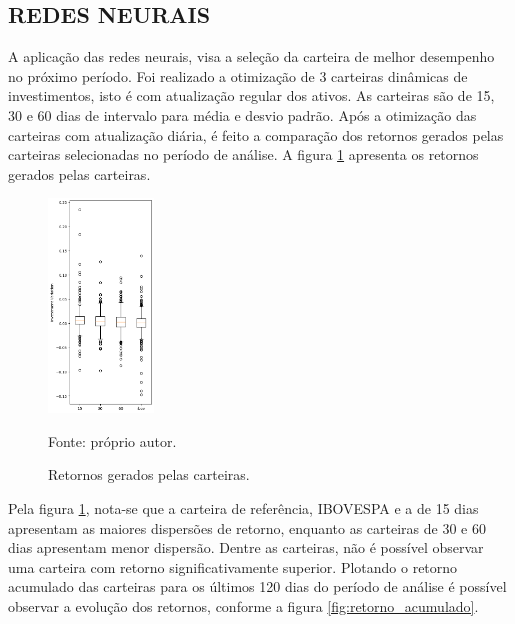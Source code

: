     \subsection{REDES NEURAIS}
    
        \ipar A aplicação das redes neurais, visa a seleção da carteira de melhor desempenho no próximo período. Foi realizado a otimização de 3 carteiras dinâmicas de investimentos, isto é com atualização regular dos ativos. As carteiras são de 15, 30 e 60 dias de intervalo para média e desvio padrão. Após a otimização das carteiras com atualização diária, é feito a comparação dos retornos gerados pelas carteiras selecionadas no período de análise. A figura \ref{fig:boxplot_inv} apresenta os retornos gerados pelas carteiras.

        \begin{figure}[H]
            \centering
            \caption{Retornos gerados pelas carteiras.}
            \label{fig:boxplot_inv}
            \includegraphics[width=0.25\textwidth]{./imagens/boxplot_inv.png}
            \par \footnotesize Fonte: próprio autor.
        \end{figure}

        \ipar Pela figura \ref{fig:boxplot_inv}, nota-se que a carteira de referência, \acrshort{IBOVESPA} e a de 15 dias apresentam as maiores dispersões de retorno, enquanto as carteiras de 30 e 60 dias apresentam menor dispersão. Dentre as carteiras, não é possível observar uma carteira com retorno significativamente superior. Plotando o retorno acumulado das carteiras para os últimos 120 dias do período de análise é possível observar a evolução dos retornos, conforme a figura \ref{fig:retorno_acumulado}.


